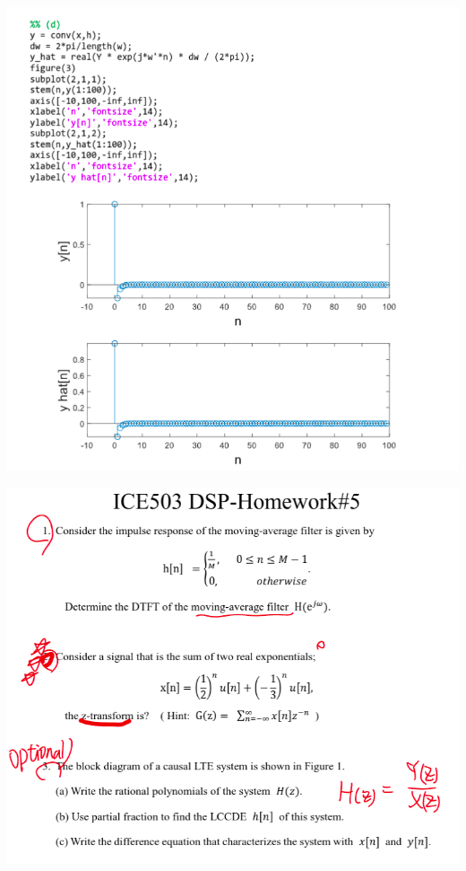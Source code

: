 \documentclass[a4paper]{article}
\begin{document}
	\begin{center}
		\includegraphics[width=1\linewidth]{screenshot038}
	\end{center}
	
	
\newpage

	
	\begin{center}
		\includegraphics[width=1\linewidth]{screenshot039}
	\end{center}
	
\end{document}

